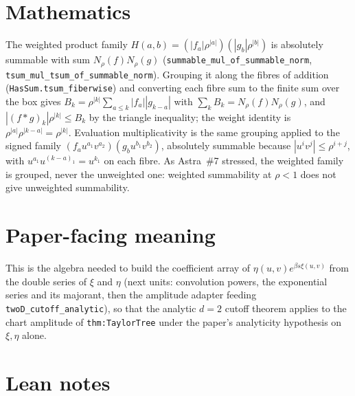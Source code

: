 \documentclass[11pt]{article}
\begin{document}
\section{Mathematics}

The weighted product family $H(a,b)=(|f_a|\rho^{|a|})(|g_b|\rho^{|b|})$ is absolutely summable
with sum $N_\rho(f)N_\rho(g)$ (\texttt{summable\_mul\_of\_summable\_norm},
\texttt{tsum\_mul\_tsum\_of\_summable\_norm}). Grouping it along the fibres of addition
(\texttt{HasSum.tsum\_fiberwise}) and converting each fibre sum to the finite sum over the box gives
$B_k=\rho^{|k|}\sum_{a\le k}|f_a||g_{k-a}|$ with $\sum_kB_k=N_\rho(f)N_\rho(g)$, and
$|(f*g)_k|\rho^{|k|}\le B_k$ by the triangle inequality; the weight identity is
$\rho^{|a|}\rho^{|k-a|}=\rho^{|k|}$. Evaluation multiplicativity is the same grouping applied to
the signed family $(f_au^{a_1}v^{a_2})(g_bu^{b_1}v^{b_2})$, absolutely summable because
$|u^iv^j|\le\rho^{i+j}$, with $u^{a_1}u^{(k-a)_1}=u^{k_1}$ on each fibre. As Astra~\#7 stressed,
the weighted family is grouped, never the unweighted one: weighted summability at $\rho<1$ does not
give unweighted summability.

\section{Paper-facing meaning}

This is the algebra needed to build the coefficient array of $\eta(u,v)e^{\beta s\xi(u,v)}$ from the
double series of $\xi$ and $\eta$ (next units: convolution powers, the exponential series and its
majorant, then the amplitude adapter feeding \texttt{twoD\_cutoff\_analytic}), so that the analytic
$d=2$ cutoff theorem applies to the chart amplitude of \texttt{thm:TaylorTree} under the paper's
analyticity hypothesis on $\xi,\eta$ alone.

\section{Lean notes}
\end{document}
